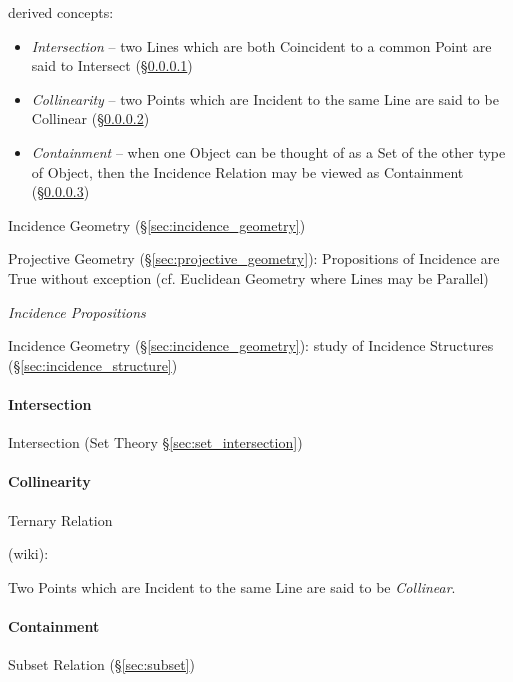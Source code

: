 derived concepts:
\begin{itemize}
  \item \emph{Intersection} -- two Lines which are both Coincident to a common
    Point are said to Intersect (\S\ref{sec:intersection})
  \item \emph{Collinearity} -- two Points which are Incident to the same Line
    are said to be Collinear (\S\ref{sec:collinearity})
  \item \emph{Containment} -- when one Object can be thought of as a Set of the
    other type of Object, then the Incidence Relation may be viewed as
    Containment (\S\ref{sec:containment})
\end{itemize}

Incidence Geometry (\S\ref{sec:incidence_geometry})

Projective Geometry (\S\ref{sec:projective_geometry}): Propositions of Incidence
are True without exception (cf. Euclidean Geometry where Lines may be Parallel)

\emph{Incidence Propositions}

\fist Incidence Geometry (\S\ref{sec:incidence_geometry}): study of Incidence
  Structures (\S\ref{sec:incidence_structure})



\paragraph{Intersection}\label{sec:intersection}\hfill

\fist Intersection (Set Theory \S\ref{sec:set_intersection})



\paragraph{Collinearity}\label{sec:collinearity}\hfill

Ternary Relation

(wiki):

Two Points which are Incident to the same Line are said to be \emph{Collinear}.



\paragraph{Containment}\label{sec:containment}\hfill

\fist Subset Relation (\S\ref{sec:subset})



